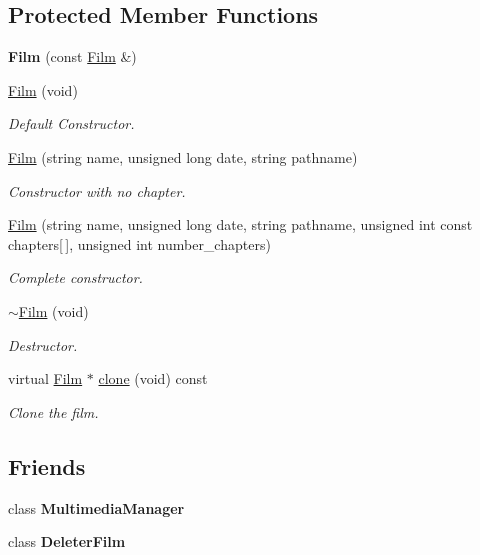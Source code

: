 \subsection*{Protected Member Functions}
\begin{DoxyCompactItemize}
\item 
\hypertarget{class_film_a34c9de2efb9554ce1192e4110d98806b}{{\bfseries Film} (const \hyperlink{class_film}{Film} \&)}\label{class_film_a34c9de2efb9554ce1192e4110d98806b}

\item 
\hyperlink{class_film_aea0f4a8e9741b3c38d4d4d9234ed2ec5}{Film} (void)
\begin{DoxyCompactList}\small\item\em Default Constructor. \end{DoxyCompactList}\item 
\hyperlink{class_film_aa85c4f92943306412e2279c9cd8df7ef}{Film} (string name, unsigned long date, string pathname)
\begin{DoxyCompactList}\small\item\em Constructor with no chapter. \end{DoxyCompactList}\item 
\hyperlink{class_film_abac72e9c84e539851cfe325c6d296acd}{Film} (string name, unsigned long date, string pathname, unsigned int const chapters\mbox{[}$\,$\mbox{]}, unsigned int number\-\_\-chapters)
\begin{DoxyCompactList}\small\item\em Complete constructor. \end{DoxyCompactList}\item 
\hyperlink{class_film_a948efc1e316098a99488235dc99818af}{$\sim$\-Film} (void)
\begin{DoxyCompactList}\small\item\em Destructor. \end{DoxyCompactList}\item 
virtual \hyperlink{class_film}{Film} $\ast$ \hyperlink{class_film_aa0b3eb1efeba4721d86c37ae5e671382}{clone} (void) const 
\begin{DoxyCompactList}\small\item\em Clone the film. \end{DoxyCompactList}\end{DoxyCompactItemize}
\subsection*{Friends}
\begin{DoxyCompactItemize}
\item 
\hypertarget{class_film_a29a97f20d6ded769adf9ecc47158e24f}{class {\bfseries Multimedia\-Manager}}\label{class_film_a29a97f20d6ded769adf9ecc47158e24f}

\item 
\hypertarget{class_film_a400d7bd5ffce270f2e592426ba786a35}{class {\bfseries Deleter\-Film}}\label{class_film_a400d7bd5ffce270f2e592426ba786a35}

\end{DoxyCompactItemize}


